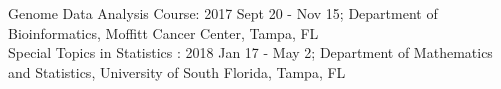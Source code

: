 \documentclass[11pt, a4paper]{article} %
\begin{document}
Genome Data Analysis Course:  2017 Sept 20 - Nov 15; Department of Bioinformatics, Moffitt Cancer Center, Tampa, FL \\

Special Topics in Statistics :  2018 Jan 17 -  May 2; Department of Mathematics and Statistics, University of South Florida, Tampa, FL





\end{document}
